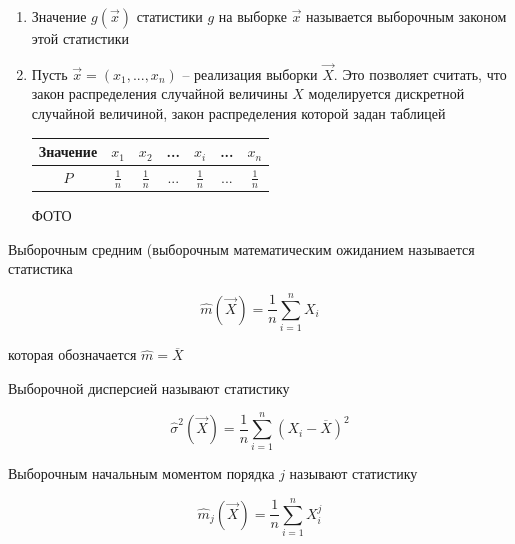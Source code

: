 \begin{note}
    \begin{enumerate}
        \item Значение $g(\vec x)$ статистики $g$ на выборке $\vec x$
            называется выборочным законом этой статистики
        \item Пусть $\vec x = (x_1, ..., x_n)$ -- реализация выборки
            $\vec X$. Это позволяет считать, что закон распределения
            случайной величины $X$ моделируется дискретной
            случайной величиной, закон распределения которой задан
            таблицей

            \begin{table}[H]
                \centering
                \begin{tabular}{|c||c|c|c|c|c|c|}
                    \hline
                    Значение & $x_1$ & $x_2$ & ... & $x_i$ & ... & $x_n$ \\
                    \hline
                    $P$ & $\frac{1}{n}$ & $\frac{1}{n}$ & ... & $\frac{1}{n}$ & ... & $\frac{1}{n}$ \\
                    \hline
                \end{tabular}
            \end{table}

            ФОТО
    \end{enumerate}
\end{note}

\begin{defenition}
    Выборочным средним (выборочным математическим ожиданием называется
    статистика

    \begin{equation*}
        \hat m(\vec X) = \frac{1}{n} \sum_{i=1}^n X_i
    \end{equation*}

    которая обозначается $\hat m = \overline{X}$
\end{defenition}

\begin{defenition}
    Выборочной дисперсией называют статистику

    \begin{equation*}
        \hat \sigma^2 (\vec X) = \frac{1}{n} \sum_{i=1}^n (X_i - \overline X)^2
    \end{equation*}
\end{defenition}

\begin{defenition}
    Выборочным начальным моментом порядка $j$ называют статистику

    \begin{equation*}
        \hat m_j (\vec X) = \frac{1}{n} \sum_{i=1}^n X_i^j
    \end{equation*}
\end{defenition}

